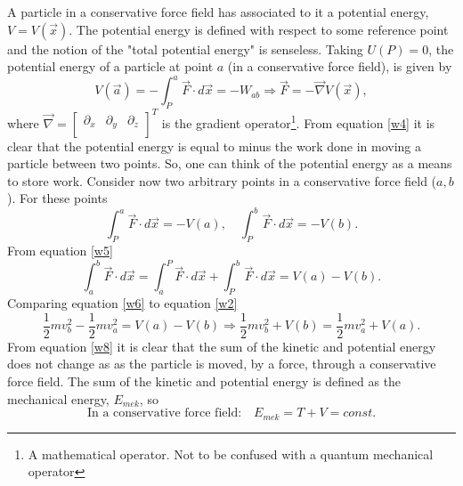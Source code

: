 A particle in a conservative force field has associated to it a potential energy, $V=V(\vec{x})$. The potential energy is defined with respect to some reference point and the notion of the "total potential energy" is senseless. Taking $U(P)=0$, the potential energy of a particle at point $a$ (in a conservative force field), is given by 
\begin{equation}
	V(\vec{a})=-\int_{P}^{a}\vec{F}\cdot d\vec{x}=-W_{ab}\Rightarrow \vec{F}=-\vec{\nabla}V(\vec{x}),
	\label{w4}
\end{equation}  
where $\vec{\nabla}=\begin{bmatrix}
	\partial_x & \partial_y & \partial _z\\
\end{bmatrix}^T$ is the gradient operator\footnote{A mathematical operator. Not to be confused with a quantum mechanical operator}. From equation \eqref{w4} it is clear that the potential energy is equal to minus the work done in moving a particle between two points. So, one can think of the potential energy as a means to store work. Consider now two arbitrary points in a conservative force field ($a,b$). For these points
\begin{equation}
	\int_P^a\vec{F}\cdot d\vec{x}=-V(a), \quad \int_P^b\vec{F}\cdot d\vec{x}=-V(b).
	\label{w5}
\end{equation} 
From equation \eqref{w5}
\begin{equation}
	\int_{a}^{b}\vec{F}\cdot d\vec{x}=\int_a^P\vec{F}\cdot d\vec{x}+\int_P^b\vec{F}\cdot d\vec{x}=V(a)-V(b).
	\label{w6}
\end{equation} 
Comparing equation \eqref{w6} to equation \eqref{w2}
\begin{equation}
	\frac{1}{2}mv_b^2-\frac{1}{2}mv_a^2=V(a)-V(b)\Rightarrow \frac{1}{2}mv_b^2+V(b)=\frac{1}{2}mv_a^2+V(a).
	\label{w8}
\end{equation}  
From equation \eqref{w8} it is clear that the sum of the kinetic and potential energy does not change as as the particle is moved, by a force, through a conservative force field. The sum of the kinetic and potential energy is defined as the mechanical energy, $E_{mek}$, so
\begin{equation}
	\text{In a conservative force field:}\quad E_{mek}=T+V=const.
\end{equation} 

